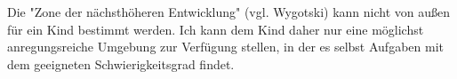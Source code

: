 Die "Zone der nächsthöheren Entwicklung" (vgl. Wygotski) kann nicht von außen für ein Kind bestimmt werden.
Ich kann dem Kind daher nur eine möglichst anregungsreiche Umgebung zur Verfügung stellen, in der es selbst Aufgaben mit dem geeigneten Schwierigkeitsgrad findet.